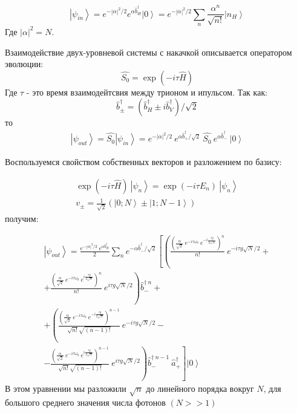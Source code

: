 \documentclass[11pt]{article}    %
\begin{document}
\begin{equation}
    \left| \psi_{in} \right> = e^{-\left| \alpha \right|^2 / 2} e^{\alpha \hat{b}^{\dag}_H} \left| 0 \right> = e^{-\left| \alpha \right|^2 / 2} \sum_n \frac{\alpha^n}{\sqrt{n!}}  \left| n_H \right>
\end{equation}
Где $ |\alpha|^2 = N $.
\par Взаимодействие двух-уровневой системы с накачкой описывается оператором эволюции:
\begin{equation}
    \hat{S_0} = \exp\left( -i \tau \hat{H} \right)
\end{equation}
Где $ \tau $ - это время взаимодейтсвия между трионом и ипульсом.
Так как:
\begin{equation}
    \hat{b}^{\dag}_{\pm} = \left( \hat{b}^{\dag}_{H} \pm i \hat{b}^{\dag}_{V} \right) / \sqrt{2}
\end{equation}
то
\begin{gather}
    \left| \psi_{out} \right> = \hat{S_0} \left| \psi_{in} \right> = e^{-\left| \alpha \right|^2 / 2} \ e^{\alpha \hat{b}^{\dag}_{+} / \sqrt{2}} \ \hat{S_0}  \ e^{\alpha \hat{b}^{\dag}_{-}} \ \left| 0 \right>
\end{gather}

Воспользуемся свойством собственных векторов и разложением по базису:

\begin{gather}
    \exp\left( -i \tau \hat{H} \right) \ \left| \psi_{n} \right> = \exp\left( -i \tau E_n \right) \ \left| \psi_{n} \right> \\
    v_{\pm} = \frac{1}{\sqrt{2}} \left( \left|  0; N \right> \pm \left| 1; N-1 \right> \right)
\end{gather}
получим:

\begin{gather} \nonumber
    \left| \psi_{out} \right> = \frac{e^{-\left| \alpha \right|^2 / 2} \ e^{\alpha \hat{b}^{\dag}_{H}}}{2} \sum_n e^{-\alpha \hat{b}^{\dag}_{-} / \sqrt{2}} \left[ \left( \frac{ \left( \frac{\alpha}{\sqrt{2}} \ e^{-i \tau \omega_0 } \ e^{-i \frac{\tau g}{2\sqrt{N}}} \right)^n}{n!}  \ e^{-i \tau g \sqrt{N} / 2} \right. \right. + \\ \nonumber
    +  \left. \frac{ \left( \frac{\alpha}{\sqrt{2}} \ e^{-i \tau \omega_0 } \ e^{i \frac{\tau g}{2\sqrt{N}}} \right)^n }{n!} \ e^{i \tau g \sqrt{N} / 2} \right) \hat{b}^{\dag \ n}_{-} + \\ \nonumber
    + \left( \frac{ \left( \frac{\alpha}{\sqrt{2}} \ e^{-i \tau \omega_0 } \ e^{-i \frac{\tau g}{2\sqrt{N}}} \right)^{n-1}}{\sqrt{n!} \sqrt{\left( n-1 \right)!} }  \ e^{-i \tau g \sqrt{N} / 2}  \right. - \\
    - \left. \left. \frac{ \left( \frac{\alpha}{\sqrt{2}} \ e^{-i \tau \omega_0 } \ e^{i \frac{\tau g}{2\sqrt{N}}} \right)^{n-1}}{\sqrt{n!} \sqrt{\left( n-1 \right)!} }  \ e^{i \tau g \sqrt{N} / 2} \right) \hat{b}^{\dag \ n-1}_{-} \ \hat{a}^{\dag}_{+}\right] \left| 0 \right>
\end{gather}
В этом уравнении мы разложили $\sqrt{n}$ до линейного порядка вокруг $N$, для большого среднего значения числа фотонов $\left( N >> 1 \right)$
\end{document}
